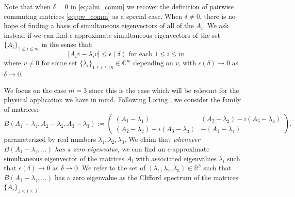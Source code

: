 \documentclass[a4paper]{article}
\begin{document}
Note that when $\delta = 0$ in \eqref{eq:alm_comm} we recover the definition of pairwise commuting matrices \eqref{eq:pw_comm} as a special case. When $\delta \neq 0$, there is no hope of finding a basis of simultaneous eigenvectors of all of the $A_i$. We ask instead if we can find {$\epsilon$-approximate simultaneous eigenvectors} of the set $\{A_i\}_{1 \leq i \leq m}$ in the sense that: 
\begin{equation} \label{eq:app_evec}
	| A_i v - \lambda_i v | \leq \epsilon(\delta) \text{ for each } 1 \leq i \leq m
\end{equation}
where $v \neq 0$ for some set $\{\lambda_i\}_{1 \leq i \leq m} \in \mathbb{C}^m$ depending on $v$, with $\epsilon(\delta) \rightarrow 0$ as $\delta \rightarrow 0$. 

We focus on the case $m = 3$ since this is the case which will be relevant for the physical application we have in mind. Following Loring \cite{2015Loring}, we consider the family of matrices: 
\begin{equation} \label{eq:B_matrix}
	B(A_1 - \lambda_1,A_2 - \lambda_2,A_3 - \lambda_3) := \begin{pmatrix} (A_1 - \lambda_1) & (A_2 - \lambda_2) - i (A_3 - \lambda_3) \\ (A_2 - \lambda_2) + i (A_3 - \lambda_3) & - (A_1 - \lambda_1) \end{pmatrix},
\end{equation}
parameterized by real numbers $\lambda_1, \lambda_2, \lambda_3$. We claim that \emph{whenever $B(A_1-\lambda_1,...)$ has a zero eigenvalue}, we can find an $\epsilon$-approximate simultaneous eigenvector of the matrices $A_i$ with associated eigenvalues $\lambda_i$ such that $\epsilon(\delta) \rightarrow 0$ as $\delta \rightarrow 0$. We refer to the set of $(\lambda_1,\lambda_2,\lambda_3) \in \mathbb{R}^3$ such that $B(A_1 - \lambda_1,...)$ has a zero eigenvalue as the {Clifford spectrum} of the matrices $\{ A_i \}_{1 \leq i \leq 3}$.
\end{document}
